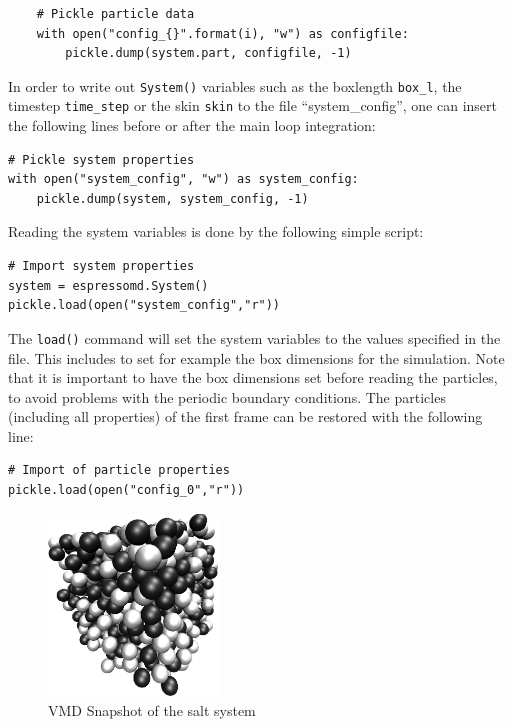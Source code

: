 \documentclass[
a4paper,                        %
11pt,                           %
twoside,                        %
footsepline,                    %
headsepline,                    %
headexclude,                    %
footexclude,                    %
pagesize,                       %
]{scrartcl}
\begin{document}
\begin{lstlisting}
    # Pickle particle data
    with open("config_{}".format(i), "w") as configfile:
        pickle.dump(system.part, configfile, -1)
\end{lstlisting}

In order to write out \verb|System()| variables such as the boxlength 
\verb|box_l|, the timestep \verb|time_step| or the skin \verb|skin| to the 
file ``system\_config'', one can insert the following lines before or after the 
main loop integration:

\begin{lstlisting}
# Pickle system properties
with open("system_config", "w") as system_config:
    pickle.dump(system, system_config, -1)
\end{lstlisting}


Reading the system variables is done by the following simple script:

\begin{lstlisting}
# Import system properties
system = espressomd.System()
pickle.load(open("system_config","r"))
\end{lstlisting}

The \verb|load()| command will set the system variables
to the values specified in the file. This includes to set for example 
the box dimensions for the simulation. Note that it is important to have the box 
dimensions set before reading the particles, to avoid problems with the periodic 
boundary conditions. The particles (including all properties) of the first 
frame can be restored with the following line:

\begin{lstlisting}
# Import of particle properties
pickle.load(open("config_0","r"))
\end{lstlisting}


\begin{figure}[tb]
  \centering
  \includegraphics[width=0.4\textwidth]{figures/salt}
  \caption{VMD Snapshot of the salt system}
  \label{fig:snapshot}
\end{figure}
\end{document}
